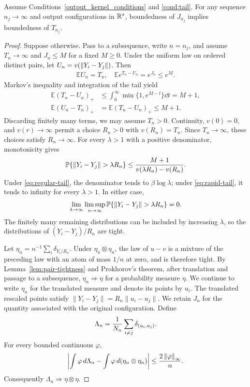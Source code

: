 \begin{lemma}\label{lem:gap-coercivity}
Assume Conditions~\ref{output_kernel_conditions} and \ref{cond:tail}. For any sequence $n_j\to\infty$ and output configurations in $\mathbb{R}^s$, boundedness of $J_{n_j}$ implies boundedness of $T_{n_j}$.
\end{lemma}
\begin{proof}
Suppose otherwise. Pass to a subsequence, write $n=n_j$, and assume $T_n\to\infty$ and $J_n\leq M$ for a fixed $M\geq0$. Under the uniform law on ordered distinct pairs, let $U_n=v(\left\lVert Y_i-Y_j\right\rVert)$. Then
\begin{align}\label{eq:gap-deviation}
\mathbb E U_n=T_n,
\quad \mathbb E e^{T_n-U_n}=e^{J_n}\leq e^M.
\end{align}
Markov's inequality and integration of the tail yield
\begin{align}\label{eq:potential-deviations}
\mathbb E(T_n-U_n)_+
&\leq\int_0^\infty\min\{1,e^{M-t}\}\dd t=M+1,\\
\mathbb E(U_n-T_n)_+&=\mathbb E(T_n-U_n)_+\leq M+1.
\end{align}
Discarding finitely many terms, we may assume $T_n>0$. Continuity, $v(0)=0$, and $v(r)\to\infty$ permit a choice $R_n>0$ with $v(R_n)=T_n$. Since $T_n\to\infty$, these choices satisfy $R_n\to\infty$. For every $\lambda>1$ with a positive denominator, monotonicity gives
\begin{align}\label{eq:rescaled-distance-tail}
\mathbb P\{\left\lVert Y_i-Y_j\right\rVert>\lambda R_n\}
\leq\frac{M+1}{v(\lambda R_n)-v(R_n)}.
\end{align}
Under \eqref{eq:regular-tail}, the denominator tends to $\beta\log\lambda$; under \eqref{eq:rapid-tail}, it tends to infinity for every $\lambda>1$. In either case,
\begin{align}
\lim_{\lambda\to\infty}\limsup_{n\to\infty}
\mathbb P\{\left\lVert Y_i-Y_j\right\rVert>\lambda R_n\}=0.\notag
\end{align}
The finitely many remaining distributions can be included by increasing $\lambda$, so the distributions of $(Y_i-Y_j)/R_n$ are tight.

Let $\eta_n=n^{-1}\sum_i\delta_{Y_i/R_n}$. Under $\eta_n\otimes\eta_n$, the law of $u-v$ is a mixture of the preceding law with an atom of mass $1/n$ at zero, and is therefore tight. By Lemma~\ref{lem:pair-tightness} and Prokhorov's theorem, after translation and passage to a subsequence, $\eta_n\Rightarrow\eta$ for a probability measure $\eta$. We continue to write $\eta_n$ for the translated measure and denote its points by $u_i$. The translated rescaled points satisfy $\|Y_i-Y_j\|=R_n\|u_i-u_j\|$. We retain $J_n$ for the quantity associated with the original configuration. Define
\begin{align}
\Lambda_n=\frac1{N_n}\sum_{i\ne j}\delta_{(u_i,u_j)}.\notag
\end{align}
For every bounded continuous $\varphi$,
\begin{align}
\left|\int\varphi\,d\Lambda_n-\int\varphi\,d(\eta_n\otimes\eta_n)\right|
\leq\frac{2\left\lVert\varphi\right\rVert_\infty}{n}.\notag
\end{align}
Consequently $\Lambda_n\Rightarrow\eta\otimes\eta$.


\end{proof}
